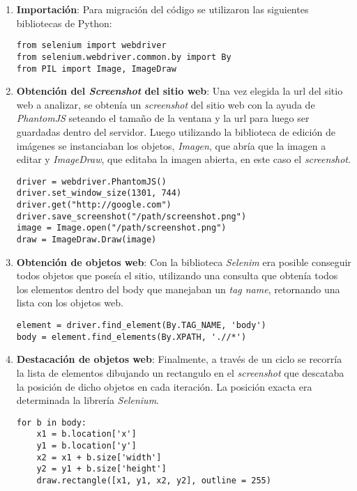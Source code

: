 	\newpage
		\begin{enumerate}
			\item \textbf{Importación}: Para migración del código se utilizaron las siguientes
			bibliotecas de Python:
			\begin{lstlisting}[style=Python, caption={Bibliotecas utilizadas para el mapa de objetos.}]
from selenium import webdriver
from selenium.webdriver.common.by import By
from PIL import Image, ImageDraw
\end{lstlisting}
			\item \textbf{Obtención  del \textit{Screenshot} del sitio web}: Una vez elegida la
			url del sitio web a analizar, se obtenía un \textit{screenshot} del sitio web con 
			la ayuda de \textit{PhantomJS} seteando el tamaño de la ventana y la url para luego
			ser guardadas dentro del servidor. Luego utilizando la biblioteca de edición de imágenes
			se instanciaban los objetos, \textit{Imagen}, que abría que la imagen a editar y 
			\textit{ImageDraw}, que editaba la imagen abierta, en este caso el \textit{screenshot}.
			\begin{lstlisting}[style=Python, caption={Destacación de objetos web}]
driver = webdriver.PhantomJS()
driver.set_window_size(1301, 744)
driver.get("http://google.com")
driver.save_screenshot("/path/screenshot.png")
image = Image.open("/path/screenshot.png")
draw = ImageDraw.Draw(image)
\end{lstlisting}
			\item \textbf{Obtención de objetos web}: Con la biblioteca \textit{Selenim} era
			posible conseguir todos objetos que poseía el sitio, utilizando una consulta que
			obtenía todos los elementos dentro del body que manejaban un \textit{tag name},
			retornando una lista con los objetos web.
\begin{lstlisting}[style=Python, caption={Consulta al body del sitio web.}]
element = driver.find_element(By.TAG_NAME, 'body')
body = element.find_elements(By.XPATH, './/*')
\end{lstlisting}
		\item \textbf{Destacación de objetos web}: Finalmente, a través de un ciclo se recorría
		la lista de elementos dibujando un rectangulo en el \textit{screenshot} que descataba la 
		posición de dicho objetos en cada iteración. La posición exacta era determinada la librería 
		\textit{Selenium}.
\begin{lstlisting}[style=Python, caption={Algoritmo mapa de objetos de simplificado
versión \textit{Python}.}]
for b in body:
	x1 = b.location['x']
	y1 = b.location['y']
	x2 = x1 + b.size['width']
	y2 = y1 + b.size['height']
	draw.rectangle([x1, y1, x2, y2], outline = 255)
\end{lstlisting}
		\end{enumerate}				
		
